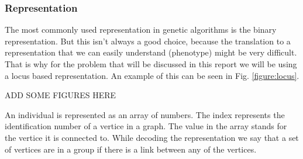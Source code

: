 \subsubsection{Representation}
The most commonly used representation in genetic algorithms is the binary representation.
But this isn't always a good choice, because the translation to a representation that we can easily understand (phenotype) might be very difficult.
That is why for the problem that will be discussed in this report we will be using a locus based representation.
An example of this can be seen in Fig. \ref{figure:locus}.

ADD SOME FIGURES HERE

An individual is represented as an array of numbers. 
The index represents the identification number of a vertice in a graph.
The value in the array stands for the vertice it is connected to.
While decoding the representation we say that a set of vertices are in a group if there is a link between any of the vertices.


